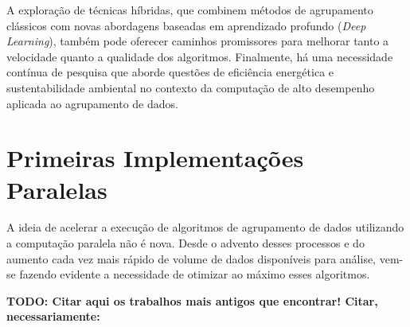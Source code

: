 \documentclass[12pt,
openright, 
oneside, %
a4paper,    %
brazil]{facom-ufu-abntex2}
\begin{document}
A exploração de técnicas híbridas, que combinem métodos de agrupamento clássicos com novas abordagens baseadas em aprendizado profundo (\textit{Deep Learning}), também pode oferecer caminhos promissores para melhorar tanto a velocidade quanto a qualidade dos algoritmos. Finalmente, há uma necessidade contínua de pesquisa que aborde questões de eficiência energética e sustentabilidade ambiental no contexto da computação de alto desempenho aplicada ao agrupamento de dados.




\section{Primeiras Implementações Paralelas}

A ideia de acelerar a execução de algoritmos de agrupamento de dados utilizando a computação paralela não é nova. Desde o advento desses processos e do aumento cada vez mais rápido de volume de dados disponíveis para análise, vem-se fazendo evidente a necessidade de otimizar ao máximo esses algoritmos.


\textbf{TODO: Citar aqui os trabalhos mais antigos que encontrar! Citar, necessariamente:}
\end{document}
